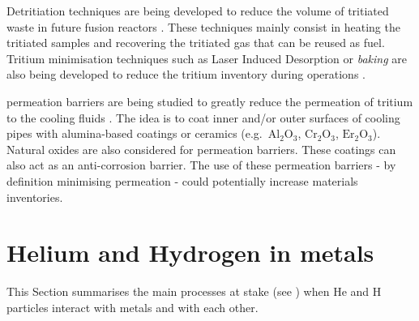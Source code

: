 Detritiation techniques are being developed to reduce the volume of tritiated waste in future fusion reactors .
These techniques mainly consist in heating the tritiated samples and recovering the tritiated gas  that can be reused as fuel.
Tritium minimisation techniques such as Laser Induced Desorption or \emph{baking} are also being developed to reduce the tritium \gls{inventory} during operations .

\Gls{permeation} barriers are being studied to greatly reduce the \gls{permeation} of tritium to the cooling fluids .
The idea is to coat inner and/or outer surfaces of cooling pipes with alumina-based coatings or ceramics (e.g.\ $\mathrm{Al_2 O_3}$, $\mathrm{Cr_2 O_3}$, $\mathrm{Er_2 O_3}$).
Natural oxides are also considered for \gls{permeation} barriers.
These coatings can also act as an anti-corrosion barrier.
The use of these \gls{permeation} barriers - by definition minimising \gls{permeation} - could potentially increase materials inventories.

\section{Helium and Hydrogen in metals}

This Section summarises the main processes at stake (see ) when \gls{He} and \gls{H} particles interact with metals and with each other.

